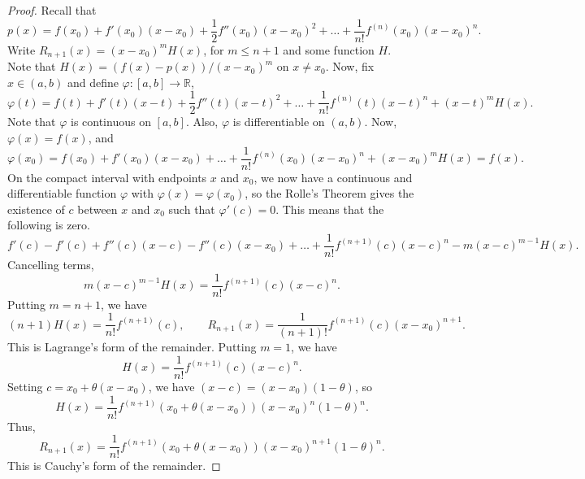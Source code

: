 \documentclass[11pt]{article}
\def\R{\mathbb{R}}
\theoremstyle{definition}
\theoremstyle{remark}
\numberwithin{equation}{module}
\begin{document}
    \begin{proof}
        Recall that \[
            p(x) = f(x_0) + f'(x_0)(x - x_0) + \frac{1}{2}f''(x_0)(x - x_0)^2 +
            \dots + \frac{1}{n!}f^{(n)}(x_0)(x - x_0)^n.
        \] Write $R_{n + 1}(x) = (x - x_0)^m H(x)$, for $m \leq n + 1$ and some function
        $H$. Note that $H(x) = (f(x) - p(x))/(x - x_0)^m$ on $x \neq x_0$. Now, fix
        $x \in (a, b)$ and define $\varphi\colon [a, b] \to \R$, \[
            \varphi(t) = f(t) + f'(t)(x - t) + \frac{1}{2}f''(t)(x - t)^2 + \dots +
            \frac{1}{n!}f^{(n)}(t)(x - t)^n + (x - t)^mH(x).
        \] Note that $\varphi$ is continuous on $[a, b]$. Also, $\varphi$ is
        differentiable on $(a, b)$. Now, $\varphi(x) = f(x)$, and \[
            \varphi(x_0) = f(x_0) + f'(x_0)(x - x_0) + \dots +
            \frac{1}{n!}f^{(n)}(x_0)(x - x_0)^n + (x - x_0)^mH(x) = f(x).
        \] On the compact interval with endpoints $x$ and $x_0$, we now have a
        continuous and differentiable function $\varphi$ with $\varphi(x) =
        \varphi(x_0)$, so the Rolle's Theorem gives the existence of $c$ between
        $x$ and $x_0$ such that $\varphi'(c) = 0$. This means that the following is
        zero. \[
            f'(c) - f'(c) + f''(c)(x - c) - f''(c)(x - x_0) + 
            \dots + \frac{1}{n!}f^{(n + 1)}(c)(x - c)^n - m(x - c)^{m - 1}H(x).
        \] Cancelling terms, \[
            m(x - c)^{m - 1}H(x) = \frac{1}{n!}f^{(n + 1)}(c)(x - c)^n.
        \] Putting $m = n + 1$, we have \[
            (n + 1)H(x) = \frac{1}{n!}f^{(n + 1)}(c), \qquad
            R_{n + 1}(x) = \frac{1}{(n + 1)!}f^{(n + 1)}(c)(x - x_0)^{n + 1}.
        \] This is Lagrange's form of the remainder.
        Putting $m = 1$, we have \[
            H(x) = \frac{1}{n!}f^{(n + 1)}(c)(x - c)^n.
        \] Setting $c = x_0 + \theta(x - x_0)$, we have $(x - c) = (x - x_0)(1 -
        \theta)$, so \[
            H(x) = \frac{1}{n!}f^{(n + 1)}(x_0 + \theta(x - x_0))(x - x_0)^n(1 -
            \theta)^n.
        \] Thus, \[
            R_{n + 1}(x) = \frac{1}{n!}f^{(n + 1)}(x_0 + \theta(x - x_0))(x -
            x_0)^{n + 1}(1 - \theta)^n.
        \] This is Cauchy's form of the remainder.
    \end{proof}
\end{document}
